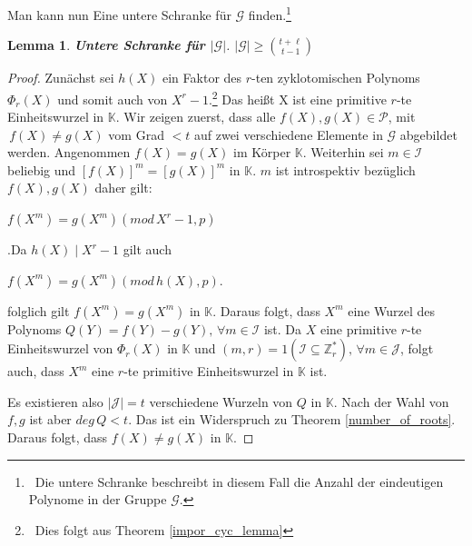 \documentclass[12pt,oneside]{article}
\newtheorem{lemma}[theorem]{Lemma}
\theoremstyle{remark}
\theoremstyle{definition}
\begin{document}
Man kann nun Eine untere Schranke für $\mathcal{G}$ finden.\footnote{$\,$ Die untere Schranke beschreibt in diesem Fall die Anzahl der eindeutigen Polynome in der Gruppe $\mathcal{G}$.}\newline

\begin{lemma}\label{lemma47}
\textbf{Untere Schranke für $|\mathcal{G}|$}.\newline
$|\mathcal{G}| \geq {t + \ell \choose t - 1}$
\end{lemma}

\begin{proof}
Zunächst sei $h(X)$ ein Faktor des $r$-ten zyklotomischen Polynoms $\Phi_r (X)$ und somit auch von $X^r - 1$.\footnote{$\,$ Dies folgt aus Theorem \ref{impor_cyc_lemma}} Das heißt X ist eine primitive $r$-te Einheitswurzel in $\mathbb{K}$. Wir zeigen zuerst, dass alle $f(X),g(X) \in \mathcal{P}$, mit $\, f(X) \neq g(X)$ vom Grad $ < t$ auf zwei verschiedene Elemente in $\mathcal{G}$ abgebildet werden.\newline\newline
Angenommen $f(X) = g(X)$ im Körper $\mathbb{K}$. Weiterhin sei $m \in \mathcal{I}$ beliebig und $[f(X)]^m = [g(X)]^m$ in $\mathbb{K}$. $m$ ist introspektiv bezüglich $f(X), g(X)$ daher gilt:\newline\newline
\centerline{$f(X^m) = g(X^m) (mod \, X^r - 1,p)$}.\newline\newline Da $h(X) \mid X^r - 1$ gilt auch\newline\newline
\centerline{$f(X^m) = g(X^m) (mod \, h(X),p)$.}\newline



folglich gilt $f(X^m) = g(X^m)$ in $\mathbb{K}$. Daraus folgt, dass $X^m$ eine Wurzel des Polynoms $Q(Y) = f(Y) - g(Y), \, \forall m \in \mathcal{I}$ ist. Da $X$ eine primitive $r$-te Einheitswurzel von $\Phi_r(X)$ in $\mathbb{K}$ und $(m,r) = 1(\mathcal{I} \subseteq \mathbb{Z}_{r}^*), \, \forall m \in \mathcal{J}$, folgt auch, dass $X^m$ eine $r$-te primitive Einheitswurzel in $\mathbb{K}$ ist.

Es existieren also $|\mathcal{J}| = t$ verschiedene Wurzeln von $Q$ in $\mathbb{K}$. Nach der Wahl von $f,g$ ist aber $deg \, Q < t$. Das ist ein Widerspruch zu Theorem \ref{number_of_roots}. Daraus folgt, dass $f(X) \neq g(X)$ in $\mathbb{K}$.


\end{proof}
\end{document}
